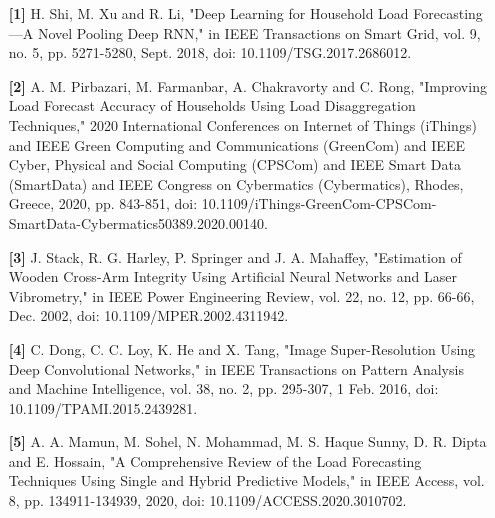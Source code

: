 \documentclass{report}
\begin{document}
\begin{itemize}
    \item[\textbf{[1]}] H. Shi, M. Xu and R. Li, "Deep Learning for Household Load Forecasting—A Novel Pooling Deep RNN," in IEEE Transactions on Smart Grid, vol. 9, no. 5, pp. 5271-5280, Sept. 2018, doi: 10.1109/TSG.2017.2686012.

    \item[\textbf{[2]}] A. M. Pirbazari, M. Farmanbar, A. Chakravorty and C. Rong, "Improving Load Forecast Accuracy of Households Using Load Disaggregation Techniques," 2020 International Conferences on Internet of Things (iThings) and IEEE Green Computing and Communications (GreenCom) and IEEE Cyber, Physical and Social Computing (CPSCom) and IEEE Smart Data (SmartData) and IEEE Congress on Cybermatics (Cybermatics), Rhodes, Greece, 2020, pp. 843-851, doi: 10.1109/iThings-GreenCom-CPSCom-SmartData-Cybermatics50389.2020.00140.

    \item[\textbf{[3]}] J. Stack, R. G. Harley, P. Springer and J. A. Mahaffey, "Estimation of Wooden Cross-Arm Integrity Using Artificial Neural Networks and Laser Vibrometry," in IEEE Power Engineering Review, vol. 22, no. 12, pp. 66-66, Dec. 2002, doi: 10.1109/MPER.2002.4311942.

    \item[\textbf{[4]}] C. Dong, C. C. Loy, K. He and X. Tang, "Image Super-Resolution Using Deep Convolutional Networks," in IEEE Transactions on Pattern Analysis and Machine Intelligence, vol. 38, no. 2, pp. 295-307, 1 Feb. 2016, doi: 10.1109/TPAMI.2015.2439281.

    \item[\textbf{[5]}] A. A. Mamun, M. Sohel, N. Mohammad, M. S. Haque Sunny, D. R. Dipta and E. Hossain, "A Comprehensive Review of the Load Forecasting Techniques Using Single and Hybrid Predictive Models," in IEEE Access, vol. 8, pp. 134911-134939, 2020, doi: 10.1109/ACCESS.2020.3010702.
\end{itemize}
\end{document}
